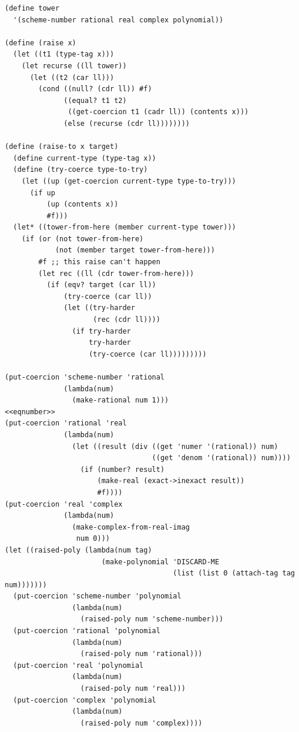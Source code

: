 \documentclass[final,fleqn,titlepage,twoside]{article}
\begin{document}
\begin{verbatim}
(define tower
  '(scheme-number rational real complex polynomial))

(define (raise x)
  (let ((t1 (type-tag x)))
    (let recurse ((ll tower))
      (let ((t2 (car ll)))
        (cond ((null? (cdr ll)) #f)
              ((equal? t1 t2)
               ((get-coercion t1 (cadr ll)) (contents x)))
              (else (recurse (cdr ll))))))))

(define (raise-to x target)
  (define current-type (type-tag x))
  (define (try-coerce type-to-try)
    (let ((up (get-coercion current-type type-to-try)))
      (if up
          (up (contents x))
          #f)))
  (let* ((tower-from-here (member current-type tower)))
    (if (or (not tower-from-here)
            (not (member target tower-from-here)))
        #f ;; this raise can't happen
        (let rec ((ll (cdr tower-from-here)))
          (if (eqv? target (car ll))
              (try-coerce (car ll))
              (let ((try-harder
                     (rec (cdr ll))))
                (if try-harder
                    try-harder
                    (try-coerce (car ll)))))))))

(put-coercion 'scheme-number 'rational
              (lambda(num)
                (make-rational num 1)))
<<eqnumber>>
(put-coercion 'rational 'real
              (lambda(num)
                (let ((result (div ((get 'numer '(rational)) num)
                                   ((get 'denom '(rational)) num))))
                  (if (number? result)
                      (make-real (exact->inexact result))
                      #f))))
(put-coercion 'real 'complex
              (lambda(num)
                (make-complex-from-real-imag
                 num 0)))
(let ((raised-poly (lambda(num tag)
                       (make-polynomial 'DISCARD-ME
                                        (list (list 0 (attach-tag tag num)))))))
  (put-coercion 'scheme-number 'polynomial
                (lambda(num)
                  (raised-poly num 'scheme-number)))
  (put-coercion 'rational 'polynomial
                (lambda(num)
                  (raised-poly num 'rational)))
  (put-coercion 'real 'polynomial
                (lambda(num)
                  (raised-poly num 'real)))
  (put-coercion 'complex 'polynomial
                (lambda(num)
                  (raised-poly num 'complex))))
\end{verbatim}
\end{document}
